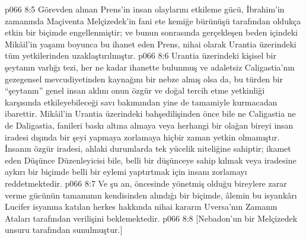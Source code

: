 \vs p066 8:5 Görevden alınan Prens’in insan olaylarını etkileme gücü, İbrahim’in zamanında Maçiventa Melçizedek’in fani ete kemiğe bürünüşü tarafından oldukça etkin bir biçimde engellenmiştir; ve bunun sonrasında gerçekleşen beden içindeki Mikâil’in yaşamı boyunca bu ihanet eden Prens, nihai olarak Urantia üzerindeki tüm yetkilerinden uzaklaştırılmıştır.
\vs p066 8:6 Urantia üzerindeki kişisel bir şeytanın varlığı tezi, her ne kadar ihanette bulunmuş ve adaletsiz Caligastia’nın gezegensel mevcudiyetinden kaynağını bir nebze almış olsa da, bu türden bir “şeytanın” genel insan aklını onun özgür ve doğal tercih etme yetkinliği karşısında etkileyebileceği savı bakımından yine de tamamiyle kurmacadan ibarettir. Mikâil’in Urantia üzerindeki bahşedilişinden önce bile ne Caligastia ne de Daligastia, fanileri baskı altına almaya veya herhangi bir olağan bireyi insan iradesi dışında bir şeyi yapmaya zorlamaya hiçbir zaman yetkin olmamıştır. İnsanın özgür iradesi, ahlaki durumlarda tek yücelik niteliğine sahiptir; ikamet eden Düşünce Düzenleyicisi bile, belli bir düşünceye sahip kılmak veya iradesine aykırı bir biçimde belli bir eylemi yaptırtmak için insanı zorlamayı reddetmektedir.
\vs p066 8:7 Ve şu an, öncesinde yönetmiş olduğu bireylere zarar verme gücünün tamamının kendisinden alındığı bir biçimde, âlemin bu isyankârı Lucifer isyanına katılan herkes hakkında nihai kararın Uversa’nın Zamanın Ataları tarafından verilişini beklemektedir.
\vs p066 8:8 [Nebadon’un bir Melçizedek unsuru tarafından sunulmuştur.]
